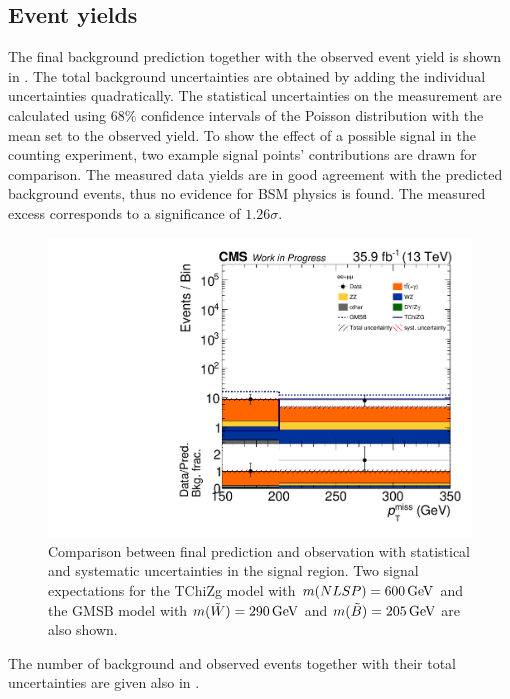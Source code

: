 \subsection{Event yields}
The final background prediction together with the observed event yield is shown in .
The total background uncertainties are obtained by adding the individual uncertainties quadratically. The statistical uncertainties on the measurement are calculated using $68\%$ confidence intervals of the Poisson distribution with the mean set to the observed yield.
To show the effect of a possible signal in the counting experiment, two example signal points' contributions are drawn for comparison. The measured data yields are in good agreement with the predicted background events, thus no evidence for BSM physics is found. The measured excess corresponds to a significance of $1.26\sigma$.
\begin{figure}[tbp]
 \centering
 \includegraphics[width=\pairwidth]{figures/UnblindingPlots/final_MC_log}
 \caption{Comparison between final prediction and observation with statistical and systematic uncertainties in the signal region. Two signal expectations for the TChiZg model with $m(NLSP)=600\,\text{Ge\hspace{-.08em}V}$ and the GMSB model with $m(\tilde{W})=290\,\text{Ge\hspace{-.08em}V}$ and $m(\tilde{B})=205\,\text{Ge\hspace{-.08em}V}$ are also shown.}
 \label{fig:result}
\end{figure}
The number of background and observed events together with their total uncertainties are given also in .
